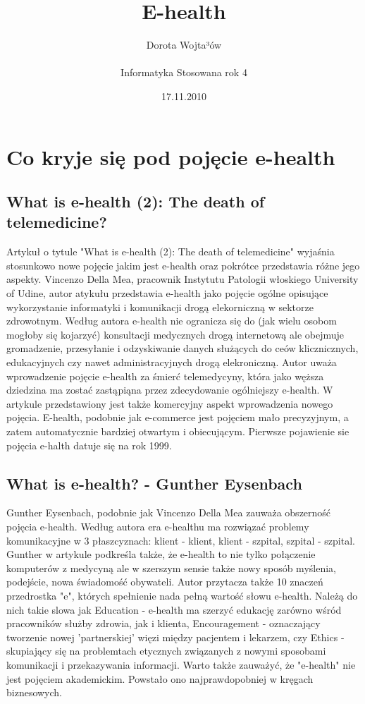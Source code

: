 \documentclass[a4paper,10pt]{article}
\begin{document}
\title{E-health}
 \author{ \LARGE Dorota Wojta³ów \\ \\ \Large Informatyka Stosowana rok 4}
\date{17.11.2010}
\maketitle
\section{ Co kryje się pod pojęcie e-health}
\subsection {What is e-health (2): The death of telemedicine?}
Artykuł o tytule "What is e-health (2): The death of telemedicine" wyjaśnia stosunkowo nowe pojęcie jakim jest e-health oraz pokrótce przedstawia
różne jego aspekty. Vincenzo Della Mea, pracownik Instytutu Patologii włoskiego University of Udine, autor atykułu przedstawia e-health jako pojęcie 
ogólne opisujące wykorzystanie informatyki i komunikacji drogą elekorniczną w sektorze zdrowotnym. Według autora e-health nie ogranicza się do (jak wielu osobom
mogłoby się kojarzyć)
konsultacji medycznych drogą internetową  ale obejmuje gromadzenie, przesyłanie i odzyskiwanie danych służących do ceów klicznicznych, edukacyjnych czy nawet administracyjnych drogą elekroniczną.
Autor uważa wprowadzenie pojęcie e-health  za śmierć telemedycyny, która jako węższa dziedzina ma zostać zastąpiąna przez zdecydowanie ogólniejszy e-health.
W artykule przedstawiony jest także komercyjny aspekt wprowadzenia nowego pojęcia. E-health, podobnie jak e-commerce jest pojęciem mało precyzyjnym, a zatem
automatycznie bardziej otwartym i obiecującym.
Pierwsze pojawienie sie pojęcia e-halth datuje się na rok 1999.

\subsection{What is e-health? - Gunther Eysenbach}
Gunther Eysenbach, podobnie jak Vincenzo Della Mea zauważa obszerność pojęcia e-health. Według autora era e-healthu ma rozwiązać problemy komunikacyjne 
w 3 płaszcyznach: klient - klient, klient - szpital, szpital - szpital. Gunther w artykule podkreśla także, że e-health to nie tylko połączenie 
komputerów z medycyną ale w szerszym sensie także nowy sposób myślenia, podejście, nowa świadomość obywateli. Autor przytacza także 10 znaczeń przedrostka
"e", których spełnienie nada pełną wartość słowu e-health. Należą do nich 
takie slowa jak Education - e-health ma szerzyć edukację zarówno wśród pracowników służby zdrowia, jak i klienta,
Encouragement - oznaczający tworzenie nowej 'partnerskiej' więzi między pacjentem i lekarzem,
czy Ethics - skupiający się na problemtach etycznych związanych z nowymi sposobami komunikacji i przekazywania informacji. 
Warto także zauważyć, że "e-health" nie jest pojęciem akademickim. Powstało ono najprawdopobniej w kręgach
biznesowych. 
\end{document}
